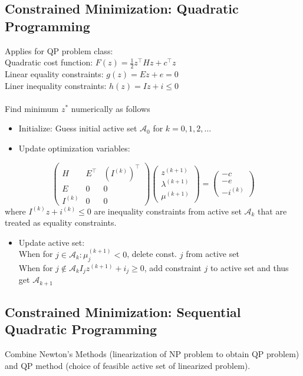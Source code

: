 \documentclass[english]{latex4ei/latex4ei_sheet}
\begin{document}
\begin{sectionbox}

\subsection{Constrained Minimization: Quadratic Programming}
Applies for QP problem class:\\
Quadratic cost function: $F(z)=\frac{1}{2}z^{\top}Hz+c^{\top}z$\\
Linear equality constraints: $g(z)=Ez+e=0$\\
Liner inequality constraints: $h(z)=Iz+i\leq 0$\\
\\
Find minimum $z^{*}$ numerically as follows
\begin{itemize}
    \item Initialize: Guess initial active set $\mathcal{A}_0$ for $k=0,1,2,\ldots$
    \item Update optimization variables:
\end{itemize}
$$\left(\begin{array}{ccc}{H} & {E^{\top}} & {\left(I^{(k)}\right)^{\top}} \\ {E} & {0} & {0} \\ {I^{(k)}} & {0} & {0}\end{array}\right)\left(\begin{array}{l}{z^{(k+1)}} \\ {\lambda^{(k+1)}} \\ {\mu^{(k+1)}}\end{array}\right)=\left(\begin{array}{c}{-c} \\ {-e} \\ {-i^{(k)}}\end{array}\right)$$
where $I^{(k)}z+i^{(k)}\leq 0$ are inequality constraints from active set $\mathcal{A}_k$ that are treated as equality constraints.
\begin{itemize}
    \item Update active set:\\
    When for $j \in \mathcal{A}_{k}: \mu_{j}^{(k+1)}<0$, delete const. $j$ from active set\\
    When for $j \notin \mathcal{A}_{k} I_{j} z^{(k+1)}+i_{j} \geq 0$, add constraint $j$ to active set and thus get $\mathcal{A}_{k+1}$
\end{itemize}

\subsection{Constrained Minimization: Sequential Quadratic Programming}
Combine Newton's Methods (linearization of NP problem to obtain QP problem) and QP method (choice of feasible active set of linearized problem).\\


\end{sectionbox}
\end{document}
